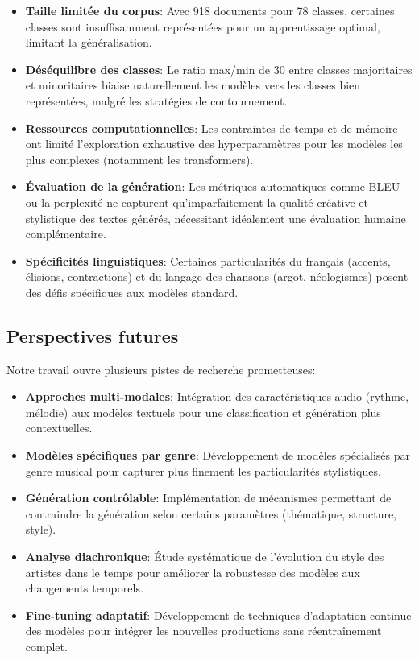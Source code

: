 \documentclass[a4paper,11pt]{article}
\begin{document}
\begin{itemize}
    \item \textbf{Taille limitée du corpus}: Avec 918 documents pour 78 classes, certaines classes sont insuffisamment représentées pour un apprentissage optimal, limitant la généralisation.
    
    \item \textbf{Déséquilibre des classes}: Le ratio max/min de 30 entre classes majoritaires et minoritaires biaise naturellement les modèles vers les classes bien représentées, malgré les stratégies de contournement.
    
    \item \textbf{Ressources computationnelles}: Les contraintes de temps et de mémoire ont limité l'exploration exhaustive des hyperparamètres pour les modèles les plus complexes (notamment les transformers).
    
    \item \textbf{Évaluation de la génération}: Les métriques automatiques comme BLEU ou la perplexité ne capturent qu'imparfaitement la qualité créative et stylistique des textes générés, nécessitant idéalement une évaluation humaine complémentaire.
    
    \item \textbf{Spécificités linguistiques}: Certaines particularités du français (accents, élisions, contractions) et du langage des chansons (argot, néologismes) posent des défis spécifiques aux modèles standard.
\end{itemize}

\subsection{Perspectives futures}
Notre travail ouvre plusieurs pistes de recherche prometteuses:

\begin{itemize}
    \item \textbf{Approches multi-modales}: Intégration des caractéristiques audio (rythme, mélodie) aux modèles textuels pour une classification et génération plus contextuelles.
    
    \item \textbf{Modèles spécifiques par genre}: Développement de modèles spécialisés par genre musical pour capturer plus finement les particularités stylistiques.
    
    \item \textbf{Génération contrôlable}: Implémentation de mécanismes permettant de contraindre la génération selon certains paramètres (thématique, structure, style).
    
    \item \textbf{Analyse diachronique}: Étude systématique de l'évolution du style des artistes dans le temps pour améliorer la robustesse des modèles aux changements temporels.
    
    \item \textbf{Fine-tuning adaptatif}: Développement de techniques d'adaptation continue des modèles pour intégrer les nouvelles productions sans réentraînement complet.
\end{itemize}
\end{document}
